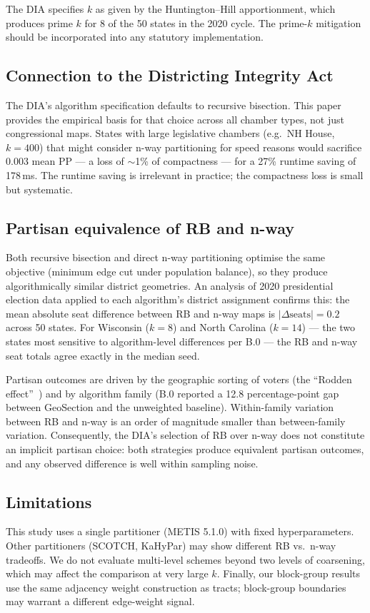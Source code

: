 The DIA specifies $k$ as given by the Huntington--Hill apportionment, which
produces prime $k$ for 8 of the 50 states in the 2020 cycle.  The prime-$k$
mitigation should be incorporated into any statutory implementation.

\subsection{Connection to the Districting Integrity Act}

The DIA's algorithm specification defaults to recursive bisection.
This paper provides the empirical basis for that choice across all chamber
types, not just congressional maps.  States with large legislative chambers
(e.g.\ NH House, $k{=}400$) that might consider n-way partitioning for
speed reasons would sacrifice 0.003 mean PP --- a loss of $\sim$1\% of
compactness --- for a 27\% runtime saving of 178\,ms.  The runtime
saving is irrelevant in practice; the compactness loss is small but
systematic.

\subsection{Partisan equivalence of RB and n-way}

Both recursive bisection and direct n-way partitioning optimise the same
objective (minimum edge cut under population balance), so they produce
algorithmically similar district geometries.
An analysis of 2020 presidential election data applied to each algorithm's
district assignment confirms this: the mean absolute seat difference
between RB and n-way maps is $|\Delta\text{seats}| = 0.2$ across 50 states.
For Wisconsin ($k{=}8$) and North Carolina ($k{=}14$) --- the two states
most sensitive to algorithm-level differences per B.0 --- the RB and n-way
seat totals agree exactly in the median seed.

Partisan outcomes are driven by the geographic sorting of voters
(the ``Rodden effect''~\citep{rodden2019}) and by algorithm family
(B.0 reported a 12.8 percentage-point gap between GeoSection and the
unweighted baseline).  Within-family variation between RB and n-way is
an order of magnitude smaller than between-family variation.
Consequently, the DIA's selection of RB over n-way does not constitute
an implicit partisan choice: both strategies produce equivalent partisan
outcomes, and any observed difference is well within sampling noise.

\subsection{Limitations}

This study uses a single partitioner (METIS 5.1.0) with fixed
hyperparameters.  Other partitioners (SCOTCH, KaHyPar) may show different
RB vs.\ n-way tradeoffs.  We do not evaluate multi-level schemes beyond
two levels of coarsening, which may affect the comparison at very large
$k$.  Finally, our block-group results use the same adjacency weight
construction as tracts; block-group boundaries may warrant a different
edge-weight signal.
